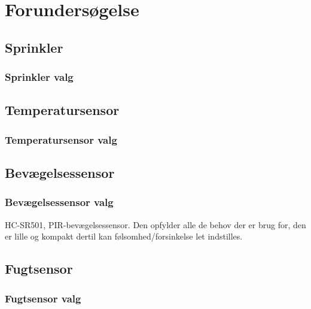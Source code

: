 \chapter{Forundersøgelse}

\section{Sprinkler}								%

\subsection{Sprinkler valg}						%

\section{Temperatursensor}						

\subsection{Temperatursensor valg}				%

\section{Bevægelsessensor}						

\subsection{Bevægelsessensor valg}				%
HC-SR501, PIR-bevægelsessensor. Den opfylder alle de behov der er brug for, den er lille og kompakt dertil kan følsomhed/forsinkelse let indstilles.

\section{Fugtsensor}						

\subsection{Fugtsensor valg}						%
